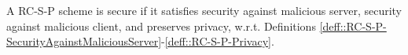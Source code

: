 %
% 
% 
% 
%
 
 
 
 \begin{definition}[RC-S-P Security]\label{def::RC-S-P-Security} A RC-S-P scheme is secure if it satisfies security against malicious server, security against malicious client, and preserves privacy, w.r.t. Definitions \ref{deff::RC-S-P-SecurityAgainstMaliciousServer}-\ref{deff::RC-S-P-Privacy}. 
 \end{definition}
 

 
 
